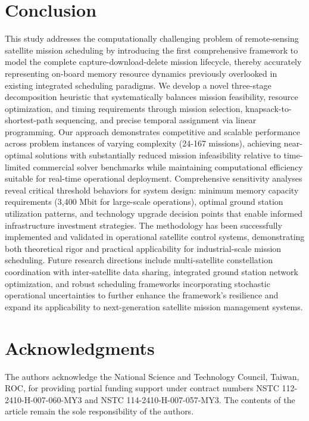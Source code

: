\documentclass[preprint,3p,12pt,authoryear]{elsarticle}
\begin{document}
\section{Conclusion}
This study addresses the computationally challenging problem of remote-sensing satellite mission scheduling by introducing the first comprehensive framework to model the complete capture-download-delete mission lifecycle, thereby accurately representing on-board memory resource dynamics previously overlooked in existing integrated scheduling paradigms. We develop a novel three-stage decomposition heuristic that systematically balances mission feasibility, resource optimization, and timing requirements through mission selection, knapsack-to-shortest-path sequencing, and precise temporal assignment via linear programming. Our approach demonstrates competitive and scalable performance across problem instances of varying complexity (24-167 missions), achieving near-optimal solutions with substantially reduced mission infeasibility relative to time-limited commercial solver benchmarks while maintaining computational efficiency suitable for real-time operational deployment. Comprehensive sensitivity analyses reveal critical threshold behaviors for system design: minimum memory capacity requirements (3,400 Mbit for large-scale operations), optimal ground station utilization patterns, and technology upgrade decision points that enable informed infrastructure investment strategies. The methodology has been successfully implemented and validated in operational satellite control systems, demonstrating both theoretical rigor and practical applicability for industrial-scale mission scheduling. Future research directions include multi-satellite constellation coordination with inter-satellite data sharing, integrated ground station network optimization, and robust scheduling frameworks incorporating stochastic operational uncertainties to further enhance the framework's resilience and expand its applicability to next-generation satellite mission management systems.

\section*{Acknowledgments}
The authors acknowledge the National Science and Technology Council, Taiwan, ROC, for providing partial funding support under contract numbers NSTC 112-2410-H-007-060-MY3 and NSTC 114-2410-H-007-057-MY3. The contents of the article remain the sole responsibility of the authors.




\end{document}
